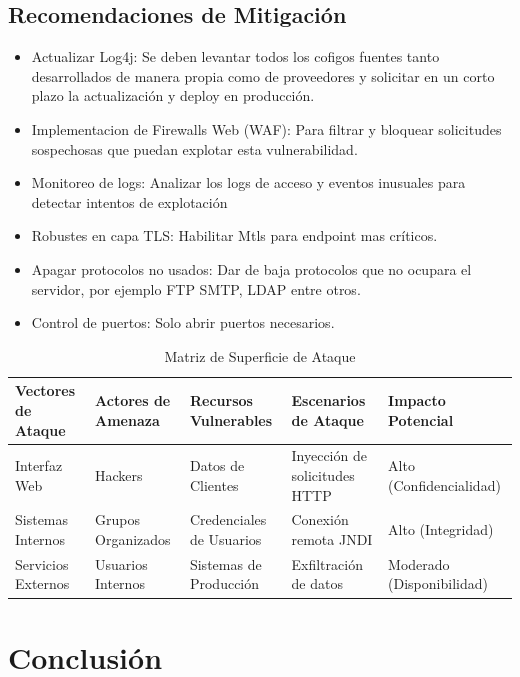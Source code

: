 \documentclass[stu, 11pt, letterpaper, donotrepeattitle, floatsintext, natbib]{apa7}
\begin{document}
\subsection{Recomendaciones de Mitigación}
\begin{itemize}
\item Actualizar Log4j: Se deben levantar todos los cofigos fuentes tanto desarrollados de manera propia como de proveedores y solicitar en un corto plazo la actualización y deploy en producción.
\item Implementacion de Firewalls Web (WAF): Para filtrar y bloquear solicitudes sospechosas que puedan explotar esta vulnerabilidad.
\item Monitoreo de logs: Analizar los logs de acceso y eventos inusuales para detectar intentos de explotación
\item Robustes en capa TLS: Habilitar Mtls para endpoint mas críticos.
\item Apagar protocolos no usados: Dar de baja protocolos que no ocupara el servidor, por ejemplo FTP SMTP, LDAP entre otros.
\item Control de puertos: Solo abrir puertos necesarios.
\end{itemize}

\begin{table}[h]
\centering
\caption{Matriz de Superficie de Ataque}
\begin{tabular}{| m{3cm} | m{3cm} | m{3cm} | m{3cm} | m{3cm} |}
\hline
\textbf{Vectores de Ataque} & \textbf{Actores de Amenaza} & \textbf{Recursos Vulnerables} & \textbf{Escenarios de Ataque} & \textbf{Impacto Potencial} \\
\hline
Interfaz Web & Hackers & Datos de Clientes & Inyección de solicitudes HTTP & Alto (Confidencialidad) \\
\hline
Sistemas Internos & Grupos Organizados & Credenciales de Usuarios & Conexión remota JNDI & Alto (Integridad) \\
\hline
Servicios Externos & Usuarios Internos & Sistemas de Producción & Exfiltración de datos & Moderado (Disponibilidad) \\
\hline
\end{tabular}
\label{tabla:superficie_ataque}
\end{table}

\clearpage

\section{ Conclusión}
\end{document}
